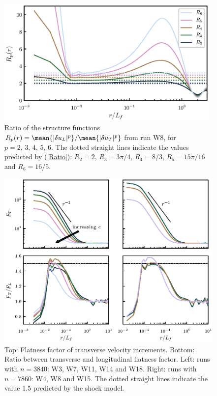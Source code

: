 \begin{figure}
\centerline{\includegraphics[width=11cm]{paper_04_shallow_water/Pyfig/fig8}}
\caption{
Ratio of the structure functions
$R_p(r) = \mean{|\delta u_L|^p} / \mean{|\delta u_T|^p}$ from run W8,
for $ p = 2, \, 3, \, 4, \, 5, \, 6. $
The dotted straight lines indicate the values predicted by (\ref{Ratio}):
$R_2 = 2$, $R_3 = 3\pi/4$,  $R_4 = 8/3$, $ R_5 = 15 \pi /16 $ and $ R_6 = 16/5 $.}
\label{fig_ratio}
\end{figure}

\begin{figure}
\centerline{\includegraphics[]{paper_04_shallow_water/Pyfig/fig9}}
\caption{ Top: Flatness factor of transverse velocity increments. Bottom: Ratio between transverse and longitudinal flatness factor. Left: runs with $ n=3840 $: W3,
W7, W11,  W14 and W18. Right: runs with $ n = 7860 $: W4, W8 and W15.  The dotted straight lines indicate the value 1.5 predicted by the shock model.  }
\label{fig_flatness}
\end{figure}

